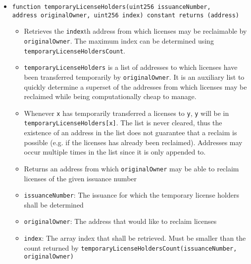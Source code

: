 \documentclass[a4paper]{article}
\begin{document}
\begin{itemize}
  \item \texttt{function temporaryLicenseHolders(uint256 issuanceNumber, \\address originalOwner, uint256 index) constant returns (address)}
  \begin{itemize}
    \item Retrieves the \texttt{index}th address from which licenses may be reclaimable by \texttt{originalOwner}. The maximum index can be determined using \texttt{temporaryLicenseHoldersCount}.
    \item \texttt{temporaryLicenseHolders} is a list of addresses to which licenses have been transferred temporarily by \texttt{originalOwner}. It is an auxiliary list to quickly determine a superset of the addresses from which licenses may be reclaimed while being computationally cheap to manage.
    \item Whenever \texttt{x} has temporarily transferred a licenses to \texttt{y}, \texttt{y} will be in \texttt{temporaryLicenseHolders[x]}. The list is  never cleared, thus the existence of an address in the list does not guarantee that a reclaim is possible (e.g. if the licenses has already been reclaimed). Addresses may occur multiple times in the list since it is only appended to.
    \item Returns an address from which \texttt{originalOwner} may be able to reclaim licenses of the given issuance number
    \item \texttt{issuanceNumber}: The issuance for which the temporary license holders shall be determined
    \item \texttt{originalOwner}: The address that would like to reclaim licenses
    \item \texttt{index}: The array index that shall be retrieved. Must be smaller than the count returned by \texttt{temporaryLicenseHoldersCount(issuanceNumber, originalOwner)}
  \end{itemize}
  

\end{itemize}
\end{document}
